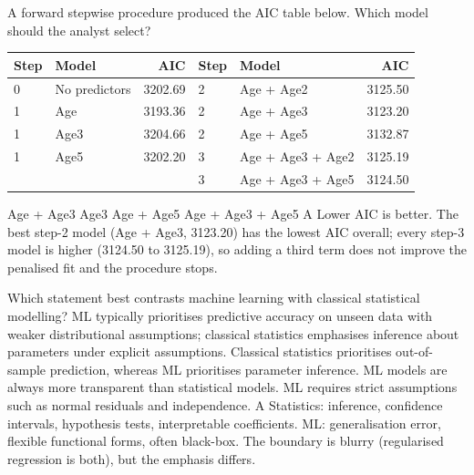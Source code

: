 {A forward stepwise procedure produced the AIC table below. Which model should the analyst select?
	\begin{center}\scriptsize
		\begin{tabular}{@{}llr@{\quad}llr@{}}
			\toprule
			Step & Model & AIC & Step & Model & AIC \\
			\midrule
			0 & No predictors & 3202.69 & 2 & Age + Age2 & 3125.50 \\
			1 & Age & 3193.36 & 2 & Age + Age3 & 3123.20 \\
			1 & Age3 & 3204.66 & 2 & Age + Age5 & 3132.87 \\
			1 & Age5 & 3202.20 & 3 & Age + Age3 + Age2 & 3125.19 \\
			& & & 3 & Age + Age3 + Age5 & 3124.50 \\
			\bottomrule
\end{tabular}\end{center}}
{Age + Age3}
{Age3}
{Age + Age5}
{Age + Age3 + Age5}
{A}
{Lower AIC is better. The best step-2 model (Age + Age3, 3123.20) has the lowest AIC overall; every step-3 model is higher (3124.50 to 3125.19), so adding a third term does not improve the penalised fit and the procedure stops.}

{Which statement best contrasts machine learning with classical statistical modelling?}
{ML typically prioritises predictive accuracy on unseen data with weaker distributional assumptions; classical statistics emphasises inference about parameters under explicit assumptions.}
{Classical statistics prioritises out-of-sample prediction, whereas ML prioritises parameter inference.}
{ML models are always more transparent than statistical models.}
{ML requires strict assumptions such as normal residuals and independence.}
{A}
{Statistics: inference, confidence intervals, hypothesis tests, interpretable coefficients. ML: generalisation error, flexible functional forms, often black-box. The boundary is blurry (regularised regression is both), but the emphasis differs.}

